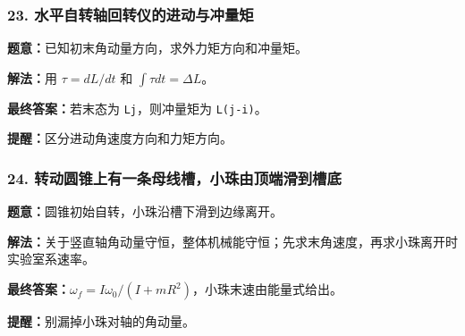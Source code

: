\documentclass[12pt,a4paper]{ctexart}
\begin{document}
\subsubsection*{23. 水平自转轴回转仪的进动与冲量矩}
\begin{tcolorbox}[colback=gray!2!white,colframe=black!60,title={题目}]
\textbf{题意：}已知初末角动量方向，求外力矩方向和冲量矩。\par
\end{tcolorbox}
\begin{tcolorbox}[colback=blue!2!white,colframe=blue!55!black,title={完整答案}]
\textbf{解法：}用 \(τ=dL/dt\) 和 \(∫τdt=ΔL\)。\par
\textbf{最终答案：}若末态为 \texttt{Lj}，则冲量矩为 \texttt{L(j-i)}。\par

\end{tcolorbox}
\begin{tcolorbox}[colback=red!2!white,colframe=red!55!black,title={易错点}]
\textbf{提醒：}区分进动角速度方向和力矩方向。\par
\end{tcolorbox}

\subsubsection*{24. 转动圆锥上有一条母线槽，小珠由顶端滑到槽底}
\begin{tcolorbox}[colback=gray!2!white,colframe=black!60,title={题目}]
\textbf{题意：}圆锥初始自转，小珠沿槽下滑到边缘离开。\par
\end{tcolorbox}
\begin{tcolorbox}[colback=blue!2!white,colframe=blue!55!black,title={完整答案}]
\textbf{解法：}关于竖直轴角动量守恒，整体机械能守恒；先求末角速度，再求小珠离开时实验室系速率。\par
\textbf{最终答案：}\(ω_f=Iω_0/(I+mR^2)\)，小珠末速由能量式给出。\par

\end{tcolorbox}
\begin{tcolorbox}[colback=red!2!white,colframe=red!55!black,title={易错点}]
\textbf{提醒：}别漏掉小珠对轴的角动量。\par
\end{tcolorbox}
\end{document}
